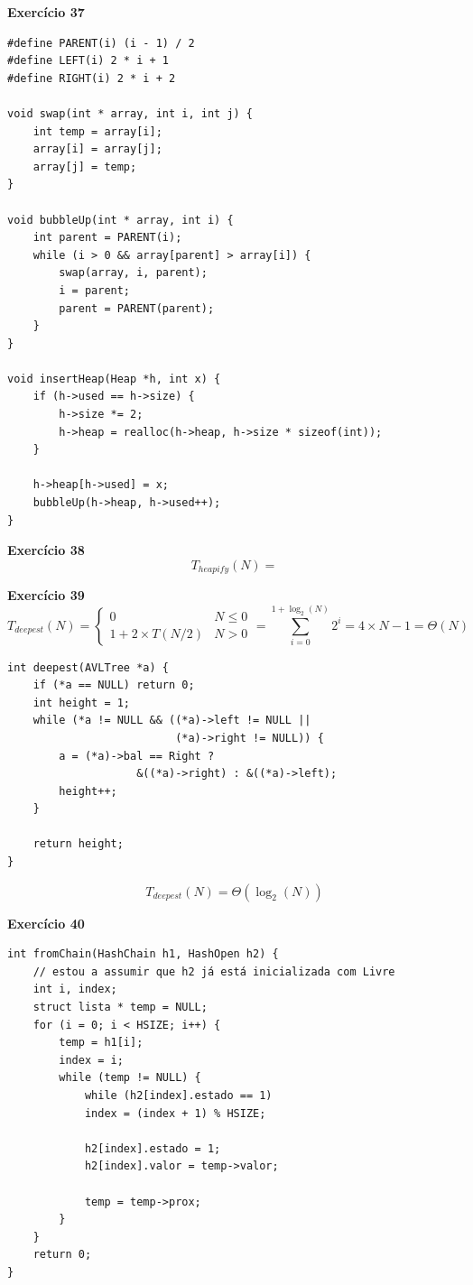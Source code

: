 \documentclass[a4paper,11pt]{article}
\begin{document}
\noindent \textbf{Exercício 37}

\begin{verbatim}
#define PARENT(i) (i - 1) / 2
#define LEFT(i) 2 * i + 1
#define RIGHT(i) 2 * i + 2

void swap(int * array, int i, int j) {
	int temp = array[i];
	array[i] = array[j];
	array[j] = temp;
}

void bubbleUp(int * array, int i) {
	int parent = PARENT(i);
	while (i > 0 && array[parent] > array[i]) {
		swap(array, i, parent);
		i = parent;
		parent = PARENT(parent);
	}
}

void insertHeap(Heap *h, int x) {
	if (h->used == h->size) {
		h->size *= 2;
		h->heap = realloc(h->heap, h->size * sizeof(int));
	}
	
	h->heap[h->used] = x;
	bubbleUp(h->heap, h->used++);
}

\end{verbatim}

\noindent \textbf{Exercício 38}
\[
	T_{heapify}(N) = 
\]

\noindent \textbf{Exercício 39}
\[
T_{deepest}(N) = 
\begin{cases}
	0 & N \leq 0 \\
	1 + 2 \times T(N/2) & N > 0
\end{cases}
= \sum_{i=0}^{1+\log_2(N)} 2^i = 4 \times N - 1 = \Theta(N)
\]

\begin{verbatim}
int deepest(AVLTree *a) {
	if (*a == NULL) return 0; 
	int height = 1;
	while (*a != NULL && ((*a)->left != NULL || 
						  (*a)->right != NULL)) {
		a = (*a)->bal == Right ?
					&((*a)->right) : &((*a)->left);
		height++;
	}
		
	return height;
}
\end{verbatim}
\[
T_{deepest}(N) = \Theta(\log_2(N))
\]

\noindent \textbf{Exercício 40}

\begin{verbatim}
int fromChain(HashChain h1, HashOpen h2) {
	// estou a assumir que h2 já está inicializada com Livre
	int i, index;
	struct lista * temp = NULL;
	for (i = 0; i < HSIZE; i++) {
		temp = h1[i];
		index = i;
		while (temp != NULL) {
			while (h2[index].estado == 1)
			index = (index + 1) % HSIZE;
			
			h2[index].estado = 1;
			h2[index].valor = temp->valor;
			
			temp = temp->prox;
		}
	}
	return 0;
}
\end{verbatim}
\end{document}
